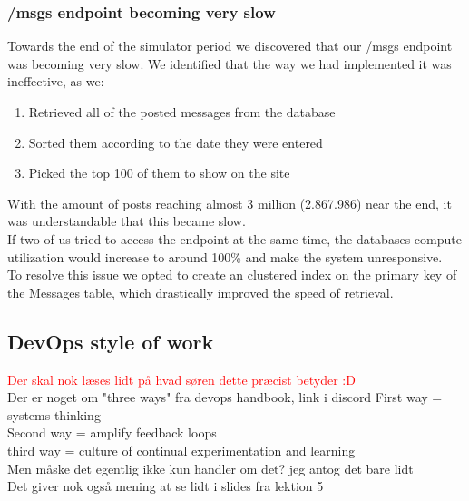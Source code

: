 

\subsubsection{/msgs endpoint becoming very slow}
Towards the end of the simulator period we discovered that our /msgs endpoint was becoming very slow.
We identified that the way we had implemented it was ineffective, as we: 
\begin{enumerate}
    \item Retrieved all of the posted messages from the database
    \item Sorted them according to the date they were entered 
    \item Picked the top 100 of them to show on the site
\end{enumerate}
With the amount of posts reaching almost 3 million (2.867.986) near the end, it was understandable that this became slow. \\ 
If two of us tried to access the endpoint at the same time, the databases compute utilization would increase to around 100\% and make the system unresponsive. \\
To resolve this issue we opted to create an clustered index on the primary key of the Messages table, which drastically improved the speed of retrieval.



\subsection{DevOps style of work}
\textcolor{red}{Der skal nok læses lidt på hvad søren dette præcist betyder :D} \\
Der er noget om "three ways" fra devops handbook, link i discord 
First way = systems thinking \\
Second way = amplify feedback loops \\
third way = culture of continual experimentation and learning \\
Men måske det egentlig ikke kun handler om det? jeg antog det bare lidt \\
Det giver nok også mening at se lidt i slides fra lektion 5


